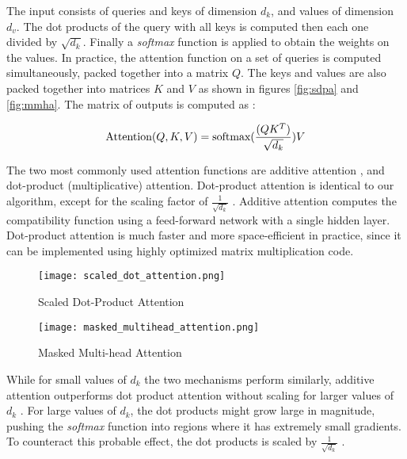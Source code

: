 The input consists of queries and keys of dimension $d_k$, and values of dimension $d_v$. The dot products of the query with all keys is computed then each one divided by $\sqrt{d_k}$. Finally a \emph{softmax} function is applied to obtain the weights on the values. In practice, the attention function on a set of queries is computed simultaneously, packed together into a matrix $Q$. The keys and values are also packed together into matrices $K$ and $V$ as shown in figures \eqref{fig:sdpa} and \eqref{fig:mmha}. The matrix of outputs is computed as \cite{2017arXiv170603762V}:

\[\textnormal{Attention}(Q, K, V) = \textnormal{softmax}(\frac{(Q K^T)}{\sqrt{d_k}})V\]

The two most commonly used attention functions are additive attention \cite{2014arXiv14090473B}, and dot-product (multiplicative) attention. Dot-product attention is identical to our algorithm, except for the scaling factor of $\frac{1}{\sqrt{d_k}}$ . Additive attention computes the compatibility function using a feed-forward network with a single hidden layer. Dot-product attention is much faster and more space-efficient in practice, since it can be implemented using highly optimized matrix multiplication code.

\begin{figure}[!htbp]
    \centering
    \begin{minipage}{0.45\textwidth}
        \centering
        \texttt{[image: scaled\_dot\_attention.png]}
        \caption[Scaled Dot-Product Attention]{\centering Scaled Dot-Product Attention \cite{2017arXiv170603762V}}
        \label{fig:sdpa}
    \end{minipage}\hfill
    \begin{minipage}{0.45\textwidth}
        \centering
        \texttt{[image: masked\_multihead\_attention.png]}
        \caption[Masked Multi-head Attention]{\centering Masked Multi-head Attention \cite{2017arXiv170603762V}}
        \label{fig:mmha}
    \end{minipage}
\end{figure}

While for small values of $d_k$ the two mechanisms perform similarly, additive attention outperforms
dot product attention without scaling for larger values of $d_k$ \cite{2017arXiv170303906B}. For large values of $d_k$, the dot products might grow large in magnitude, pushing the \emph{softmax} function into regions where it has extremely small gradients. To counteract this probable effect, the dot products is scaled by $\frac{1}{\sqrt{d_k}}$ \cite{2017arXiv170603762V}.

